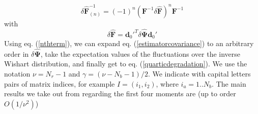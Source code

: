 \documentclass[reprint,aps,prd,superscriptaddress,showkeys,showpacs]{revtex4-1}
\newcommand{\bb}[1]{\mathbf{#1}}
\newcommand{\bbh}[1]{\mathbf{\hat{#1}}}
\begin{document}
\begin{equation}
\label{nthterm}
\delta\bbh{F}^{-1}_{(n)} = (-1)^{n}(\bb{F}^{-1}\delta\bbh{F})^n\bb{F}^{-1}
\end{equation}
%
with
\begin{equation}
\delta\bbh{F} = \bb{d}_0'^T\delta\bbh{\Psi}\bb{d}_0'
\end{equation}
%
Using eq. (\ref{nthterm}), we can expand eq. (\ref{estimatorcovariance}) to an arbitrary order in $\delta\bbh{\Psi}$, take the expectation values of the fluctuations over the inverse Wishart distribution, and finally get to eq. (\ref{quarticdegradation}). We use the notation $\nu=N_r-1$ and $\gamma=(\nu-N_b-1)/2$. We indicate with capital letters pairs of matrix indices, for example $I=(i_1,i_2)$, where $i_a=1..N_b$. The main results we take out from \citep{MasumotoWishart} regarding the first four moments are (up to order $O(1/\nu^2)$)
\end{document}
